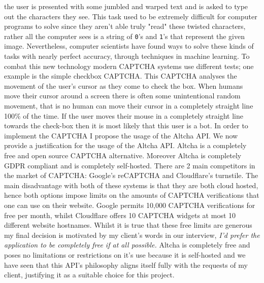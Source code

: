 the user is presented with some jumbled and warped text and is
asked to type out the characters they see. This task used to 
be extremely difficult for computer programs to solve since 
they aren't able truly "read" these twisted characters, rather
all the computer sees is a string of \texttt{0}'s and
\texttt{1}'s that represent the given image. Nevertheless, 
computer scientists have found ways to solve these kinds of 
tasks with nearly perfect accuracy, through techniques in 
machine learning. To combat this new technology modern CAPTCHA
systems use different tests; one example is the simple 
checkbox CAPTCHA. This CAPTCHA analyses the movement of the 
user's cursor as they come to check the box. When humans move 
their cursor around a screen there is often some unintentional
random movement, that is no human can move their cursor in a 
completely straight line 100\% of the time. If the user moves 
their mouse in a completely straight line towards the
check-box then it is most likely that this user is a bot. In 
order to implement the CAPTCHA I propose the usage of the 
Altcha API. We now provide a justification for the usage of
the Altcha API. Altcha is a completely free and open source
CAPTCHA alternative. Moreover Altcha is completely GDPR 
compliant and is completely self-hosted. There are 2 main 
competitors in the market of CAPTCHA: Google's reCAPTCHA and
Cloudflare's turnstile. The main disadvantage with both of 
these systems is that they are both cloud hosted, hence both 
options impose limits on the amounts of CAPTCHA verifications 
that one can use on their website. Google permits
10,000 CAPTCHA verifications for free per month, whilst
Cloudflare offers 10 CAPTCHA widgets at most 10 different 
website hostnames. Whilst it is true that these free limits 
are generous my final decision is motivated by my client's 
words in our interview, \textit{I'd prefer the application to
be completely free if at all possible.} Altcha is completely
free and poses no limitations or restrictions on it's use 
because it is self-hosted and we have seen that this API's 
philosophy aligns itself fully with the requests of my
client, justifying it as a suitable choice for this project.
\\ \vspace{0.2cm}

